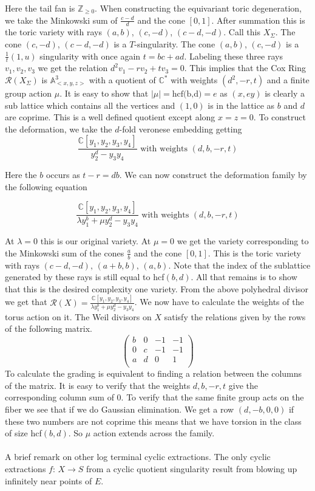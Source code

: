 \documentclass[11pt]{report}
\theoremstyle{definition}
\theoremstyle{definition}
\theoremstyle{definition}
\theoremstyle{definition}
\theoremstyle{definition}
\theoremstyle{definition}
\theoremstyle{definition}
\begin{document}
Here the tail fan is $\mathbb{Z}_{\geq 0}$. When constructing the equivariant toric degeneration, we take the Minkowski sum of $\frac{c-d}{d}$ and the cone $\left[0, 1\right]$. After summation this is the toric variety with rays $(a,b)$, $(c,-d)$, $(c-d,-d)$. Call this $X_\Sigma$. The cone $(c,-d)$, $(c-d,-d)$ is a $T$-singularity. The cone  $(a,b)$, $(c,-d)$ is a $\frac{1}{t}(1, u)$ singularity with once again $t = bc + ad$. Labeling these three rays $v_1, v_2, v_3$ we get the relation $d^2 v_1 - r v_2 + t v_3 = 0$. This implies that the Cox Ring  $\mathcal{R}(X_\Sigma)$ is $\mathbb{A}^3_{<x,y,z>}$ with a quotient of $\mathbb{C}^*$ with weights $(d^2, -r, t)$ and a finite group action $\mathbb{\mu}$. It is easy to show that $|\mathbb{\mu}| = \text{hcf(b,d)} = e$ as $(x, ey)$ is clearly a sub lattice which contains all the vertices and $(1,0)$ is in the lattice as $b$ and $d$ are coprime. This is a well defined quotient except along $x = z= 0$. To construct the deformation, we take the $d$-fold veronese embedding getting
\[
\frac{\mathbb{C}[y_1, y_2, y_3,  y_4]}{y_2^d -y_3 y_4} \text{  with weights } (d, b, -r, t)
\]

Here the $b$ occurs as $t-r = db$. We can now construct the deformation family by the following equation

\[
\frac{\mathbb{C}[y_1, y_2, y_3,  y_4]}{\lambda y_1^b  + \mu y_2^d - y_3 y_4} \text{  with weights } (d, b, -r, t)
\]

At $\lambda = 0$ this is our original variety. At $\mu = 0$ we get the variety corresponding to the Minkowski sum of the cones $\frac{a}{b}$ and the cone $\left[ 0, 1 \right]$. This is the toric variety with rays $(c-d,-d), \, (a+b, b), \, (a,b)$. Note that the index of the sublattice generated by these rays is still equal to hcf$(b, d)$. All that remains is to show that this is the desired complexity one variety. From the above polyhedral divisor we get that $\mathcal{R}(X) =\frac{\mathbb{C}[y_1, y_2, y_3,  y_4]}{\lambda y_1^b  + \mu y_2^d - y_3 y_4}$. We now have to calculate the weights of the torus action on it. The Weil divisors on $X$ satisfy the relations given by the rows of the following matrix. 
\[
 \left(
 \begin{array}{cccc}
b & 0 & -1 & -1  \\
0 & c & -1 & -1 \\
a & d & 0  & 1 \\
\end{array}
\right) 
\]
To calculate the grading is equivalent to finding a relation between the columns of the matrix. It is easy to verify that the weights $d,b,-r,t$ give the corresponding column sum of 0. To verify that the same finite group acts on the fiber we see that if we do Gaussian elimination. We get a row $(d, -b, 0 ,0)$ if these two numbers are not coprime this means that we have torsion in the class of size hcf$(b,d)$. So $\mathbb{\mu}$ action extends across the family. 
\\
\\
A brief remark on other log terminal cyclic extractions. The only cyclic extractions $f: \, X \rightarrow S$ from a cyclic quotient singularity result from blowing up infinitely near points of $E$.
\end{document}
